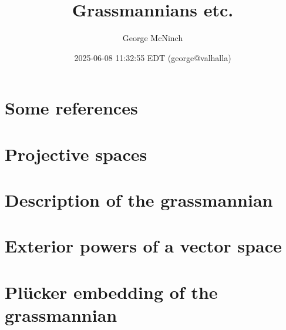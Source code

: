 \documentclass[11pt]{article}
\author{George McNinch}
\date{2025-06-08 11:32:55 EDT (george@valhalla)}
\title{Grassmannians etc.}
\numberwithin{equation}{section}
\begin{document}
\maketitle
\section{Some references}
\label{sec:org65d16f5}

\section{Projective spaces}
\label{sec:orgba9c90c}

\section{Description of the grassmannian}
\label{sec:org4421356}

\section{Exterior powers of a vector space}
\label{sec:orgcfb82d4}

\section{Plücker embedding of the grassmannian}
\label{sec:org534928d}
\end{document}
